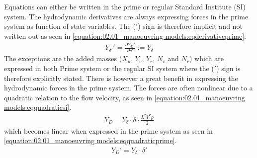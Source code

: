 \sphinxAtStartPar
Equations can either be written in the prime or regular Standard Institute (SI) system. The hydrodynamic derivatives are always expressing forces in the prime system as function of state variables. The (\('\)) sign is therefore implicit and not written out as seen in \autoref{equation:02.01_manoeuvring models:eqderivativeprime}.
\begin{equation}\label{equation:02.01_manoeuvring models:eqderivativeprime}
\begin{split}\displaystyle Y_{\delta'}'=\frac{\partial Y_D'}{\partial \delta'} := Y_{\delta} \end{split}
\end{equation}
\sphinxAtStartPar
The exceptions are the added masses (\(X_{\dot{u}}\), \(Y_{\dot{v}}\), \(Y_{\dot{r}}\), \(N_{\dot{v}}\) and \(N_{\dot{r}}\)) which are expressed in both Prime system or the regular SI system where the (\('\)) sign is therefore
explicitly stated.
There is however a great benefit in expressing the hydrodynamic forces in the prime system. The forces are often nonlinear due to a quadratic relation to the flow velocity, as seen in \autoref{equation:02.01_manoeuvring models:eqquadraticsi}.
\begin{equation}\label{equation:02.01_manoeuvring models:eqquadraticsi}
\begin{split}\displaystyle Y_{D}=Y_{\delta} \cdot \delta \cdot \frac{L^2V^2\rho}{2}\end{split}
\end{equation}
which becomes linear when expressed in the prime system as seen in \autoref{equation:02.01_manoeuvring models:eqquadraticprime}.
\begin{equation}\label{equation:02.01_manoeuvring models:eqquadraticprime}
\begin{split}\displaystyle Y_{D}'=Y_{\delta} \cdot \delta'\end{split}
\end{equation}


